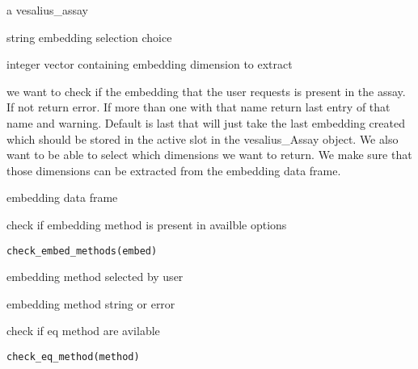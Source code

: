 \documentclass[a4paper]{book}
\begin{document}
%
\begin{Arguments}
\begin{ldescription}
\item[\code{vesalius\_assay}] a vesalius\_assay

\item[\code{embed}] string embedding selection choice

\item[\code{dims}] integer vector containing embedding dimension to extract
\end{ldescription}
\end{Arguments}
%
\begin{Details}
we want to check if the embedding that the user requests 
is present in the assay. If not return error. If more than one 
with that name return last entry of that name and warning. Default is last 
that will just take the last embedding created which should be stored in
the active slot in the vesalius\_Assay object.
We also want to be able to select which dimensions we want to return.
We make sure that those dimensions can be extracted from the embedding 
data frame.
\end{Details}
%
\begin{Value}
embedding data frame
\end{Value}
%
\begin{Description}
check if embedding method is present in availble options
\end{Description}
%
\begin{Usage}
\begin{verbatim}
check_embed_methods(embed)
\end{verbatim}
\end{Usage}
%
\begin{Arguments}
\begin{ldescription}
\item[\code{embed}] embedding method selected by user
\end{ldescription}
\end{Arguments}
%
\begin{Value}
embedding method string or error
\end{Value}
%
\begin{Description}
check if eq method are avilable
\end{Description}
%
\begin{Usage}
\begin{verbatim}
check_eq_method(method)
\end{verbatim}
\end{Usage}
\end{document}
